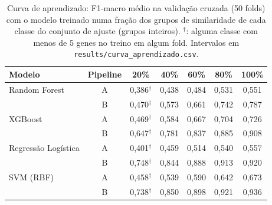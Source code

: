 \begin{table}[htbp]
  \centering
  \caption{Curva de aprendizado: F1-macro médio na validação cruzada (50 folds) com o modelo treinado numa fração dos grupos de similaridade de cada classe do conjunto de ajuste (grupos inteiros). $^\dagger$: alguma classe com menos de 5 genes no treino em algum fold. Intervalos em \texttt{results/curva\_aprendizado.csv}.}
  \label{tab:curva_aprendizado}
  \begin{tabular}{lcccccc}
    \toprule
    Modelo & Pipeline & 20\% & 40\% & 60\% & 80\% & 100\% \\
    \midrule
    Random Forest & A & 0,386$^\dagger$ & 0,438 & 0,484 & 0,531 & 0,551 \\
     & B & 0,470$^\dagger$ & 0,573 & 0,661 & 0,742 & 0,787 \\
    XGBoost & A & 0,469$^\dagger$ & 0,584 & 0,667 & 0,704 & 0,726 \\
     & B & 0,647$^\dagger$ & 0,781 & 0,837 & 0,885 & 0,908 \\
    Regressão Logística & A & 0,401$^\dagger$ & 0,459 & 0,514 & 0,540 & 0,557 \\
     & B & 0,748$^\dagger$ & 0,844 & 0,888 & 0,913 & 0,920 \\
    SVM (RBF) & A & 0,458$^\dagger$ & 0,539 & 0,590 & 0,642 & 0,673 \\
     & B & 0,738$^\dagger$ & 0,850 & 0,898 & 0,921 & 0,936 \\
    \bottomrule
  \end{tabular}
\end{table}
